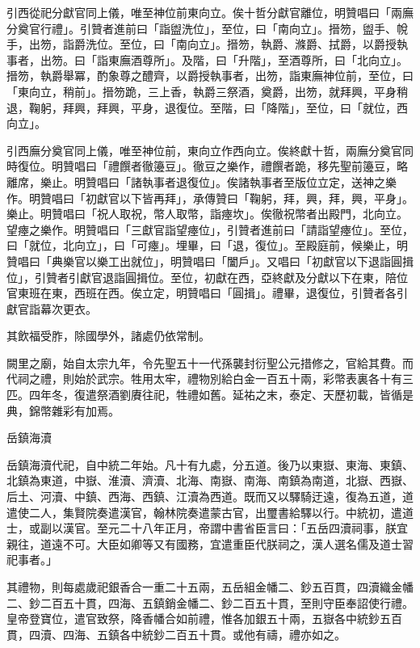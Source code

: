 \begin{pinyinscope}
 引西從祀分獻官同上儀，唯至神位前東向立。俟十哲分獻官離位，明贊唱曰「兩廡分奠官行禮」。引贊者進前曰「詣盥洗位」，至位，曰「南向立」。搢笏，盥手、帨手，出笏，詣爵洗位。至位，曰「南向立」。搢笏，執爵、滌爵、拭爵，以爵授執事者，出笏。曰「詣東廡酒尊所」。及階，曰「升階」，至酒尊所，曰「北向立」。搢笏，執爵舉冪，酌象尊之醴齊，以爵授執事者，出笏，詣東廡神位前，至位，曰「東向立，稍前」。搢笏跪，三上香，執爵三祭酒，奠爵，出笏，就拜興，平身稍退，鞠躬，拜興，拜興，平身，退復位。至階，曰「降階」，至位，曰「就位，西向立」。



 引西廡分奠官同上儀，唯至神位前，東向立作西向立。俟終獻十哲，兩廡分奠官同時復位。明贊唱曰「禮饌者徹籩豆」。徹豆之樂作，禮饌者跪，移先聖前籩豆，略離席，樂止。明贊唱曰「諸執事者退復位」。俟諸執事者至版位立定，送神之樂作。明贊唱曰「初獻官以下皆再拜」，承傳贊曰「鞠躬，拜，興，拜，興，平身」。樂止。明贊唱曰「祝人取祝，幣人取幣，詣瘞坎」。俟徹祝幣者出殿門，北向立。望瘞之樂作。明贊唱曰「三獻官詣望瘞位」，引贊者進前曰「請詣望瘞位」。至位，曰「就位，北向立」，曰「可瘞」。埋畢，曰「退，復位」。至殿庭前，候樂止，明贊唱曰「典樂官以樂工出就位」，明贊唱曰「闔戶」。又唱曰「初獻官以下退詣圓揖位」，引贊者引獻官退詣圓揖位。至位，初獻在西，亞終獻及分獻以下在東，陪位官東班在東，西班在西。俟立定，明贊唱曰「圓揖」。禮畢，退復位，引贊者各引獻官詣幕次更衣。



 其飲福受胙，除國學外，諸處仍依常制。



 闕里之廟，始自太宗九年，令先聖五十一代孫襲封衍聖公元措修之，官給其費。而代祠之禮，則始於武宗。牲用太牢，禮物別給白金一百五十兩，彩幣表裏各十有三匹。四年冬，復遣祭酒劉賡往祀，牲禮如舊。延祐之末，泰定、天歷初載，皆循是典，錦幣雜彩有加焉。



 岳鎮海瀆



 岳鎮海瀆代祀，自中統二年始。凡十有九處，分五道。後乃以東嶽、東海、東鎮、北鎮為東道，中嶽、淮瀆、濟瀆、北海、南嶽、南海、南鎮為南道，北嶽、西嶽、后土、河瀆、中鎮、西海、西鎮、江瀆為西道。既而又以驛騎迂遠，復為五道，道遣使二人，集賢院奏遣漢官，翰林院奏遣蒙古官，出璽書給驛以行。中統初，遣道士，或副以漢官。至元二十八年正月，帝謂中書省臣言曰：「五岳四瀆祠事，朕宜親往，道遠不可。大臣如卿等又有國務，宜遣重臣代朕祠之，漢人選名儒及道士習祀事者。」



 其禮物，則每處歲祀銀香合一重二十五兩，五岳組金幡二、鈔五百貫，四瀆織金幡二、鈔二百五十貫，四海、五鎮銷金幡二、鈔二百五十貫，至則守臣奉詔使行禮。皇帝登寶位，遣官致祭，降香幡合如前禮，惟各加銀五十兩，五嶽各中統鈔五百貫，四瀆、四海、五鎮各中統鈔二百五十貫。或他有禱，禮亦如之。




\end{pinyinscope}
